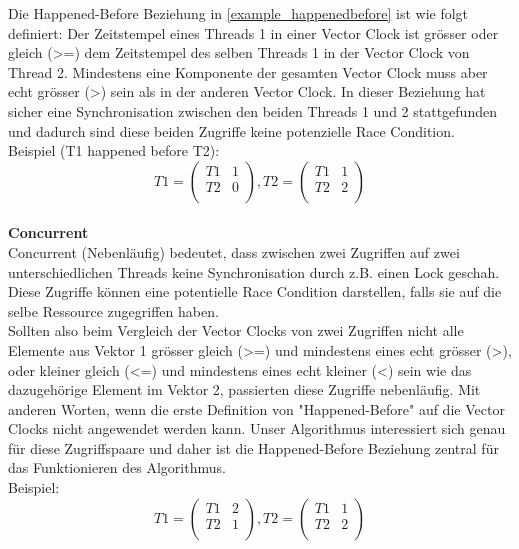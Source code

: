 \documentclass[10pt,a4paper]{article}
\begin{document}
Die Happened-Before Beziehung in \autoref{example_happenedbefore} ist wie folgt definiert: Der Zeitstempel eines Threads 1 in einer Vector Clock ist grösser oder gleich (>=) dem Zeitstempel des selben Threads 1 in der Vector Clock von Thread 2. Mindestens eine Komponente der gesamten Vector Clock muss aber echt grösser (>) sein als in der anderen Vector Clock. In dieser Beziehung hat sicher eine Synchronisation zwischen den beiden Threads 1 und 2 stattgefunden und dadurch sind diese beiden Zugriffe keine potenzielle Race Condition.\\
Beispiel (T1 happened before T2):\\
\[
	T1 = \begin{pmatrix}
		T1 & 1\\
		T2 & 0\\
	\end{pmatrix}
	, T2 = \begin{pmatrix}
		T1 & 1\\
		T2 & 2\\
	\end{pmatrix}
\]
\\[0.5cm]
\textbf{Concurrent}\\[0.2cm]
Concurrent (Nebenläufig) bedeutet, dass zwischen zwei Zugriffen auf zwei unterschiedlichen Threads keine Synchronisation durch z.B. einen Lock geschah. Diese Zugriffe können eine potentielle Race Condition darstellen, falls sie auf die selbe Ressource zugegriffen haben.\\
Sollten also beim Vergleich der Vector Clocks von zwei Zugriffen nicht alle Elemente aus Vektor 1 grösser gleich (>=) und mindestens eines echt grösser (>), oder kleiner gleich (<=) und mindestens eines echt kleiner (<) sein wie das dazugehörige Element im Vektor 2, passierten diese Zugriffe nebenläufig. Mit anderen Worten, wenn die erste Definition von "Happened-Before" auf die Vector Clocks nicht angewendet werden kann. Unser Algorithmus interessiert sich genau für diese Zugriffspaare und daher ist die Happened-Before Beziehung zentral für das Funktionieren des Algorithmus. \\
Beispiel:\\
\[
	T1 = \begin{pmatrix}
		T1 & 2\\
		T2 & 1\\
	\end{pmatrix}
	, T2 = \begin{pmatrix}
		T1 & 1\\
		T2 & 2\\
	\end{pmatrix}
\]
\\[0.5cm]
\newpage
\end{document}
